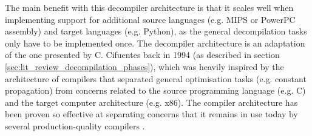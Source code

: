 The main benefit with this decompiler architecture is that it scales well when implementing support for additional source languages (e.g. MIPS or PowerPC assembly) and target languages (e.g. Python), as the general decompilation tasks only have to be implemented once. The decompiler architecture is an adaptation of the one presented by C. Cifuentes back in 1994 (as described in section \ref{sec:lit_review_decompilation_phases}), which was heavily inspired by the architecture of compilers that separated general optimisation tasks (e.g. constant propagation) from concerns related to the source programming language (e.g. C) and the target computer architecture (e.g. x86). The compiler architecture has been proven so effective at separating concerns that it remains in use today by several production-quality compilers \cite{llvm_architecture,gcc_architecture}.
